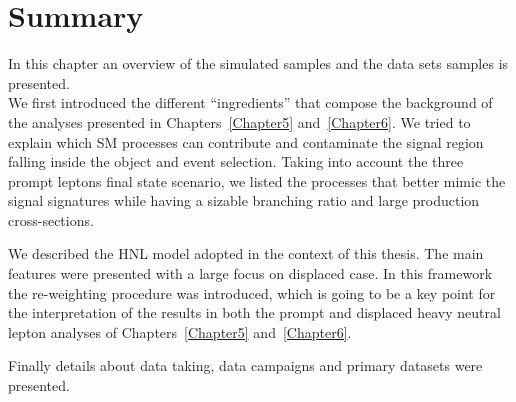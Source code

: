 \section{Summary}\label{sec:summaryC4}
In this chapter an overview of the simulated samples and the data sets
samples is presented.\\
We first introduced the different ``ingredients'' that compose the
background of the analyses presented in Chapters~\ref{Chapter5}
and~\ref{Chapter6}. We tried to explain which SM processes can
contribute and contaminate the signal region falling inside the object and event
selection.  Taking into account the three prompt
leptons final state scenario, we listed the processes that better
mimic the signal signatures while having a sizable branching
ratio and large production cross-sections. 

We described the HNL model adopted in the context of this thesis. The
main features were presented with a large focus on
displaced case. In this framework the re-weighting procedure was
introduced, which is going to be a key point for the 
interpretation of the results in both the prompt and displaced heavy neutral lepton
analyses of Chapters~\ref{Chapter5}
and~\ref{Chapter6}.

Finally details about data taking, data campaigns and primary datasets were presented.


